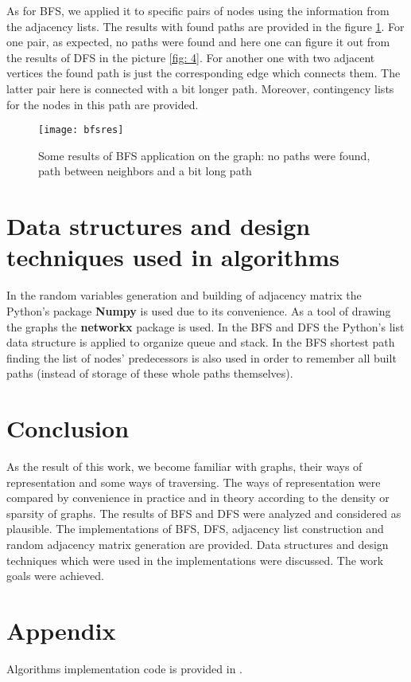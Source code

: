 \documentclass[12pt, bachelor, substylefile = algo_title.rtx]{disser}
\theoremstyle{definition}
\begin{document}
As for BFS, we applied it to specific pairs of nodes using the information from the adjacency lists. The results with found paths are provided in the figure \ref{fig: 6}. For one pair, as expected, no paths were found and here one can figure it out from the results of DFS in the picture \ref{fig: 4}. For another one with two adjacent vertices the found path is just the corresponding edge which connects them. The latter pair here is connected with a bit longer path. Moreover, contingency lists for the nodes in this path are provided. 

\begin{figure}[!h]
\begin{center}
\texttt{[image: bfsres]}
\caption{Some results of BFS application on the graph: no paths were found, path between neighbors and a bit long path}
\label{fig: 6}
\end{center}
\end{figure}


\section{Data structures and design techniques used in algorithms}


In the random variables generation and building of adjacency matrix the Python's package \textbf{Numpy} is used due to its convenience. As a tool of drawing the graphs the \textbf{networkx} package is used. In the BFS and DFS the Python's list data structure is applied to organize queue and stack. In the BFS shortest path finding the list of nodes' predecessors is also used in order to remember all built paths (instead of storage of these whole paths themselves). 


\section{Conclusion}
As the result of this work, we become familiar with graphs, their ways of representation and some ways of traversing. The ways of representation were compared by convenience in practice and in theory according to the density or sparsity of graphs. The results of BFS and DFS were analyzed and considered as plausible. The implementations of BFS, DFS, adjacency list construction and random adjacency matrix generation are provided. Data structures and design techniques which were used in the implementations were discussed. The work goals were achieved.

\section{Appendix}
Algorithms implementation code is provided in \cite{repogithub}.

{\small }

\end{document}
